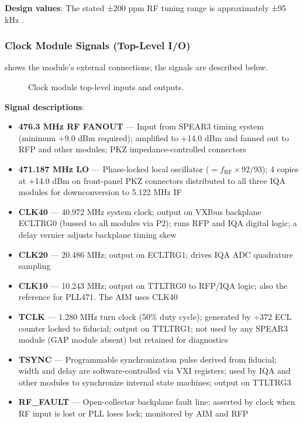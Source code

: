 \begin{keynote}
\textbf{Design values}: The stated ±200 ppm RF tuning range is approximately ±95 kHz .
\end{keynote}

\subsubsection{Clock Module Signals (Top-Level I/O)}

 shows the module's external connections; the signals are described below.

\begin{figure}[tbp]\centering
\begin{fitpicture}\end{fitpicture}
\caption{Clock module top-level inputs and outputs.}\label{fig:clock-io}
\end{figure}

\textbf{Signal descriptions}:

\begin{itemize}
\tightlist
\item
  \textbf{476.3 MHz RF FANOUT} --- Input from SPEAR3 timing system (minimum +9.0 dBm required); amplified to +14.0 dBm and fanned out to RFP and other modules; PKZ impedance-controlled connectors
\item
  \textbf{471.187 MHz LO} --- Phase-locked local oscillator ($= f_\text{RF} \times 92/93$); 4 copies at +14.0 dBm on front-panel PKZ connectors distributed to all three IQA modules for downconversion to 5.122 MHz IF
\item
  \textbf{CLK40} --- 40.972 MHz system clock; output on VXIbus backplane ECLTRG0 (bussed to all modules via P2); runs RFP and IQA digital logic; a delay vernier adjusts backplane timing skew
\item
  \textbf{CLK20} --- 20.486 MHz; output on ECLTRG1; drives IQA ADC quadrature sampling
\item
  \textbf{CLK10} --- 10.243 MHz; output on TTLTRG0 to RFP/IQA logic; also the reference for PLL471. The AIM uses CLK40
\item
  \textbf{TCLK} --- 1.280 MHz turn clock (50\% duty cycle); generated by ÷372 ECL counter locked to fiducial; output on TTLTRG1; not used by any SPEAR3 module (GAP module absent) but retained for diagnostics
\item
  \textbf{TSYNC} --- Programmable synchronization pulse derived from fiducial; width and delay are software-controlled via VXI registers; used by IQA and other modules to synchronize internal state machines; output on TTLTRG3
\item
  \textbf{RF\_FAULT} --- Open-collector backplane fault line; asserted by clock when RF input is lost or PLL loses lock; monitored by AIM and RFP
\end{itemize}

